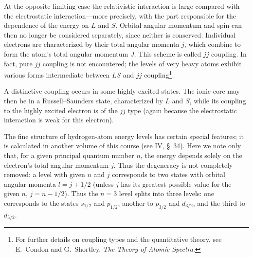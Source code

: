 At the opposite limiting case the relativistic interaction is large compared with the electrostatic interaction---more precisely, with the part responsible for the dependence of the energy on $L$ and $S$. Orbital angular momentum and spin can then no longer be considered separately, since neither is conserved. Individual electrons are characterized by their total angular momenta $j$, which combine to form the atom's total angular momentum $J$. This scheme is called $jj$ coupling. In fact, pure $jj$ coupling is not encountered; the levels of very heavy atoms exhibit various forms intermediate between $LS$ and $jj$ coupling\footnote{For further details on coupling types and the quantitative theory, see E.~Condon and G.~Shortley, \emph{The Theory of Atomic Spectra}.}.

A distinctive coupling occurs in some highly excited states. The ionic core may then be in a Russell--Saunders state, characterized by $L$ and $S$, while its coupling to the highly excited electron is of the $jj$ type (again because the electrostatic interaction is weak for this electron).

The fine structure of hydrogen-atom energy levels has certain special features; it is calculated in another volume of this course (see IV, \S~34). Here we note only that, for a given principal quantum number $n$, the energy depends solely on the electron's total angular momentum $j$. Thus the degeneracy is not completely removed: a level with given $n$ and $j$ corresponds to two states with orbital angular momenta $l=j\pm1/2$ (unless $j$ has its greatest possible value for the given $n$, $j=n-1/2$). Thus the $n=3$ level splits into three levels: one corresponds to the states $s_{1/2}$ and $p_{1/2}$, another to $p_{3/2}$ and $d_{3/2}$, and the third to $d_{5/2}$.
